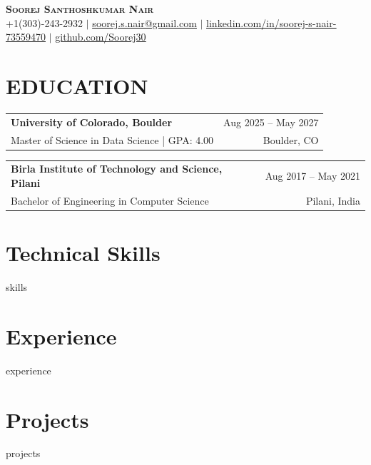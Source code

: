 \documentclass[letterpaper,11pt]{article}
\newcommand{\resumeSubHeadingListStart}{\begin{itemize}[leftmargin=0.15in, label={}, itemsep=0pt, parsep=0pt, topsep=0pt]}
\newcommand{\resumeSubHeadingListEnd}{\end{itemize}\vspace{0pt}}
\begin{document}
\begin{center}
    \textbf{\Huge \scshape Soorej Santhoshkumar Nair} \\ \vspace{2pt}
    \small +1(303)-243-2932 $|$ 
    \href{mailto:soorej.s.nair@gmail.com}{\underline{soorej.s.nair@gmail.com}} $|$ 
    \href{https://linkedin.com/in/soorej-s-nair-73559470}{\underline{linkedin.com/in/soorej-s-nair-73559470}} $|$
    \href{https://github.com/Soorej30}{\underline{github.com/Soorej30}}
\end{center}

\vspace{-19pt}

\section*{EDUCATION}

\newcommand{\eduentry}[4]{%
  \noindent
  \begin{tabularx}{\linewidth}{@{}X r@{}}
    \textbf{#1} & #2 \\
    #3 & #4 \\
  \end{tabularx}
  \vspace{-2pt}
}

\eduentry
{University of Colorado, Boulder}
{Aug 2025 -- May 2027}
{Master of Science in Data Science \;|\; GPA: 4.00}
{Boulder, CO}

\eduentry
{Birla Institute of Technology and Science, Pilani}
{Aug 2017 -- May 2021}
{Bachelor of Engineering in Computer Science}
{Pilani, India}

\vspace{-12pt}

\section{Technical Skills}
\begin{itemize}
{{skills}}
\end{itemize}

\section{Experience}
\resumeSubHeadingListStart
{{experience}}

\resumeSubHeadingListEnd

\vspace{-12 pt}
\section{Projects}
\resumeSubHeadingListStart

{{projects}}
\resumeSubHeadingListEnd
\end{document}
